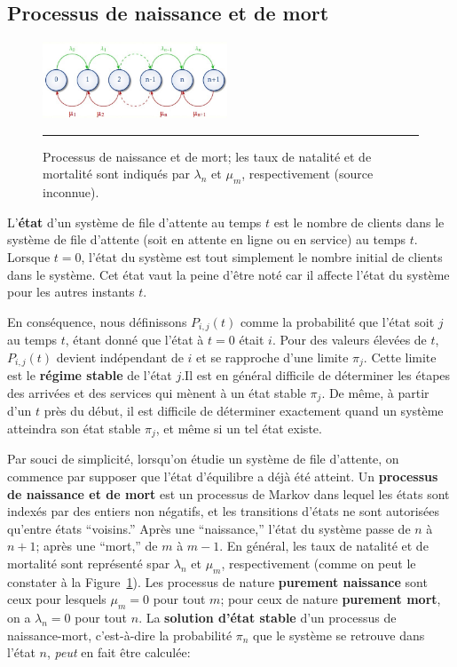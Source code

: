 \subsection{Processus de naissance et de mort}
\begin{figure}[!t]
	\centering
		\includegraphics[width=0.49\textwidth]{Images/fig2Queue.jpg}
	\caption{\small Processus de naissance et de mort; les taux de natalité et de mortalité sont indiqués par $\lambda_n$ et $\mu_m$, respectivement (source inconnue).}
	\label{fig:2}\hrule
\end{figure}
L'\textbf{état} d'un système de file d’attente au temps $t$ est le nombre de clients dans le système de file d’attente (soit en attente en ligne ou en service) au temps $t$. Lorsque $t = 0$, l'état du système est tout simplement le nombre initial de clients dans le système.  Cet état vaut la peine d'être noté car il affecte l'état du syst\`eme pour les autres instants $t$.  \par En conséquence, nous définissons $P_{i,j} (t)$ comme la probabilité que l'état soit $j$ au temps $t$, étant donné que l'état à $t = 0$ était $i$. Pour des valeurs élevées de $t$, $P_{i,j} (t)$ devient indépendant de $i$ et se rapproche d'une limite $\pi_{j}$. Cette limite est le \textbf{régime stable} de l’état $j$.\newl Il est en général difficile de déterminer les étapes des arrivées et des services qui mènent à un état stable $\pi_j$. De même, à partir d'un $t$ près du début, il est difficile de déterminer exactement quand un système atteindra son état stable $\pi_j$, et même si un tel état existe. \par Par souci de simplicité, lorsqu'on étudie un système de file d'attente, on commence par supposer que l'état d'équilibre a déjà été atteint.\newl  
Un \textbf{processus de naissance et de mort} est un processus de Markov dans lequel les états sont indexés par des entiers non négatifs, et les transitions d’états ne sont autorisées qu'entre états ``voisins.'' Après une ``naissance,'' l'état du système passe de $n$ à $n+1$; après une ``mort,'' de $m$ à $m-1$. En général, les taux de natalité et de mortalité sont représenté spar $\lambda_n$ et $\mu_m$, respectivement (comme on peut le constater à la Figure~\ref{fig:2}). Les processus de nature  \textbf{purement naissance} sont ceux pour lesquels $\mu_m=0$ pour tout $m$; pour ceux de nature \textbf{purement mort}, on a $\lambda_n=0$ pour tout $n$. La \textbf{solution d'état stable} d'un processus de naissance-mort, c'est-à-dire la probabilité $\pi_n$ que le système se retrouve dans l'état $n$, \textit{peut} en fait être calculée: 
